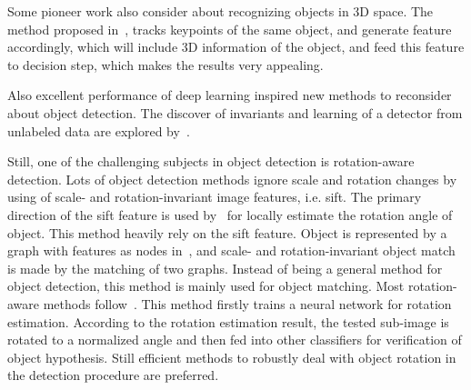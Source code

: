 Some pioneer work also consider about recognizing objects in 3D space. The method proposed in~\cite{r3d}, tracks keypoints of the same object, and generate feature accordingly, which will include 3D information of the object, and feed this feature to decision step, which makes the results very appealing.

Also excellent performance of deep learning inspired new methods to reconsider about object detection. The discover of invariants and learning of a detector from unlabeled data are explored by~\cite{dnnnn}.


Still, one of the challenging subjects in object detection is rotation-aware detection. Lots of object detection methods ignore scale and rotation changes by using of scale- and rotation-invariant image features, i.e. sift.
The primary  direction of the sift feature is used by~\cite{ac21} for locally estimate the rotation angle of object. This method heavily rely on the sift feature.
Object is represented by a graph with features as nodes in~\cite{ac222}, and scale- and rotation-invariant object match is made by the matching of two graphs. Instead of being a general method for object detection, this method is mainly used for object matching.
Most rotation-aware methods follow~\cite{ac20}. This method firstly trains a neural network for rotation estimation. According to the rotation estimation result, the tested sub-image is rotated to a normalized angle and then fed into other classifiers for verification of object hypothesis. Still efficient methods to robustly deal with object rotation in the detection procedure are preferred.




\begin{comment}
(a) a well-de?ned closed boundary
in space; (b) a different appearance from their surroundings [23, 25]; (c) sometimes it is unique within the image
and stands out as salient
\end{comment}

